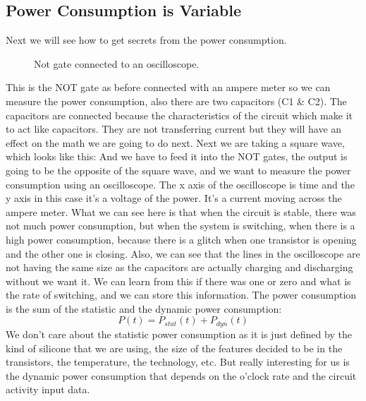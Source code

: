 \subsection { Power Consumption is Variable }
Next we will see how to get secrets from the power consumption.
\begin{figure}[h]
    \centering
    
    \caption{Not gate connected to an oscilloscope.} \label{fig:flipflop}
\end{figure}
\newline
This is the NOT gate as before connected with an ampere meter so we can measure the power consumption, also there are two capacitors (C1 \& C2). The capacitors are connected because the characteristics of the circuit which make it to act like capacitors. They are not transferring current but they will have an effect on the math we are going to do next.
Next we are taking a square wave, which looks like this:
And we have to feed it into the NOT gates, the output is going to be the opposite of the square wave, and we want to measure the power consumption using an oscilloscope.
The x axis of the oscilloscope is time and the y axis in this case it's a voltage of the power. It's a current moving across the ampere meter. What we can see here is that when the circuit is stable, there was not much power consumption, but when the system is switching, when there is a high power consumption, because there is a glitch when one transistor is opening and the other one is closing.
Also, we can see that the lines in the oscilloscope are not having the same size as the capacitors are actually charging and discharging without we want it. We can learn from this if there was one or zero and what is the rate of switching, and we can store this information.
The power consumption is the sum of the statistic and the dynamic power consumption: 
\begin{displaymath}
    P(t)=P_{stat}(t) + P_{dyn}(t)
\end{displaymath}
We don’t care about the statistic power consumption as it is just defined by the kind of silicone that we are using, the size of the features decided to be in the transistors, the temperature, the technology, etc. But really interesting for us is the dynamic power consumption that depends on the o'clock rate and the circuit activity input data.
